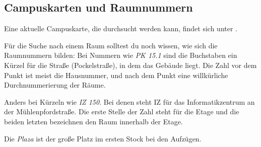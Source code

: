 
\subsection{Campuskarten und Raumnummern}
\label{campuskarte}
Eine aktuelle Campuskarte, die durchsucht werden kann, findet sich unter .



Für die Suche nach einem Raum solltest du noch wissen, wie sich die Raumnummern bilden: Bei Nummern wie \textit{PK 15.1} sind die Buchstaben ein Kürzel für die Straße (Pockelstraße), in dem das Gebäude liegt. 
Die Zahl vor dem Punkt ist meist die Hausnummer, und nach dem Punkt eine willkürliche Durchnummerierung der Räume. 

Anders bei Kürzeln wie \textit{IZ 150}. 
Bei denen steht IZ für das Informatikzentrum an der Mühlenpfordstraße.
Die erste Stelle der Zahl steht für die Etage und die beiden letzten bezeichnen den Raum innerhalb der Etage. 

Die \textit{Plaza} ist der große Platz im ersten Stock bei den Aufzügen.

